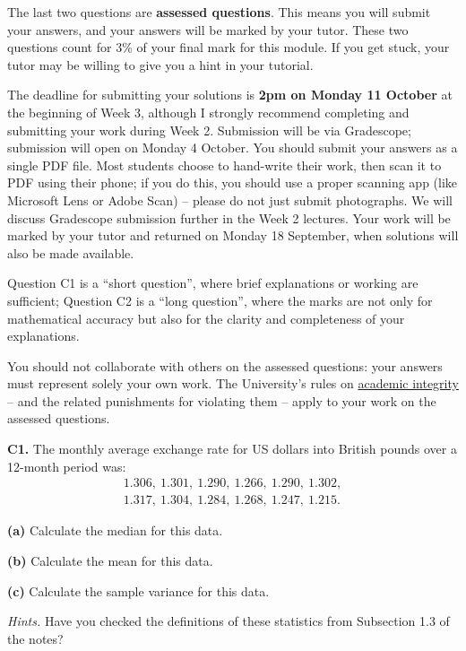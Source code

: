 \documentclass[
  a4paper,
]{book}
\theoremstyle{definition}
\theoremstyle{definition}
\theoremstyle{definition}
\theoremstyle{definition}
\theoremstyle{remark}
\begin{document}
The last two questions are \textbf{assessed questions}. This means you will submit your answers, and your answers will be marked by your tutor. These two questions count for 3\% of your final mark for this module. If you get stuck, your tutor may be willing to give you a hint in your tutorial.

The deadline for submitting your solutions is \textbf{2pm on Monday 11 October} at the beginning of Week 3, although I strongly recommend completing and submitting your work during Week 2. Submission will be via Gradescope; submission will open on Monday 4 October.
You should submit your answers as a single PDF file. Most students choose to hand-write their work, then scan it to PDF using their phone; if you do this, you should use a proper scanning app (like Microsoft Lens or Adobe Scan) -- please do not just submit photographs. We will discuss Gradescope submission further in the Week 2 lectures. Your work will be marked by your tutor and returned on Monday 18 September, when solutions will also be made available.

Question C1 is a ``short question'', where brief explanations or working are sufficient; Question C2 is a ``long question'', where the marks are not only for mathematical accuracy but also for the clarity and completeness of your explanations.

You should not collaborate with others on the assessed questions: your answers must represent solely your own work. The University's rules on \href{https://library.leeds.ac.uk/info/1401/academic_skills/46/academic_integrity_and_plagiarism}{academic integrity} -- and the related punishments for violating them -- apply to your work on the assessed questions.

\textbf{C1.} The monthly average exchange rate for US dollars into British pounds over a 12-month period was:
\begin{gather*}
1.306, \ 1.301, \ 1.290, \ 1.266, \ 1.290, \ 1.302,\\
1.317, \ 1.304, \ 1.284, \ 1.268, \ 1.247, \ 1.215.
\end{gather*}

\textbf{(a)} Calculate the median for this data.

\textbf{(b)} Calculate the mean for this data.

\textbf{(c)} Calculate the sample variance for this data.

\begin{myanswers}
\emph{Hints.}
Have you checked the definitions of these statistics from Subsection 1.3 of the notes?

\end{myanswers}
\end{document}
